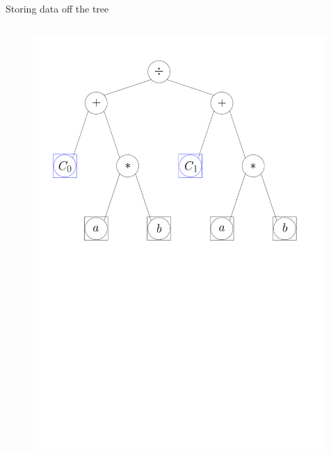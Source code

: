 \documentclass[xcolor=dvipsnames]{beamer}
\begin{document}
\begin{frame}[fragile]{Storing data off the tree}
  \begin{columns}[T] %
    \begin{column}{0.75\textwidth}
      \begin{figure}[H]
        \centering
        \includegraphics[width=0.99\textwidth]{fig_exprtree_c}
      \end{figure}
    \end{column}%
  \end{columns}
\end{frame}
\end{document}

